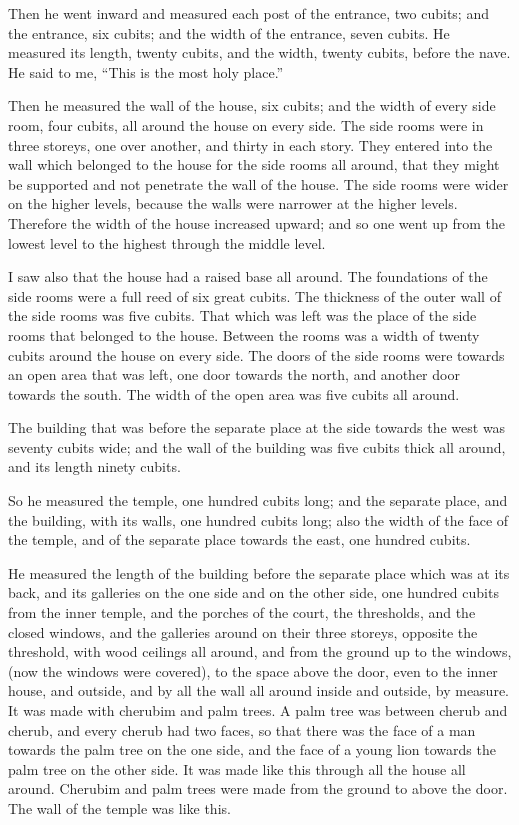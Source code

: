  Then he went inward and measured each post of the
entrance, two cubits; and the entrance, six cubits; and the width of the
entrance, seven cubits.  He measured its length, twenty
cubits, and the width, twenty cubits, before the nave. He said to me,
``This is the most holy place.''

 Then he measured the wall of the house, six cubits; and
the width of every side room, four cubits, all around the house on every
side.  The side rooms were in three storeys, one over
another, and thirty in each story. They entered into the wall which
belonged to the house for the side rooms all around, that they might be
supported and not penetrate the wall of the house.  The
side rooms were wider on the higher levels, because the walls were
narrower at the higher levels. Therefore the width of the house
increased upward; and so one went up from the lowest level to the
highest through the middle level.

 I saw also that the house had a raised base all around.
The foundations of the side rooms were a full reed of six great cubits.
 The thickness of the outer wall of the side rooms was
five cubits. That which was left was the place of the side rooms that
belonged to the house.  Between the rooms was a width of
twenty cubits around the house on every side.  The doors
of the side rooms were towards an open area that was left, one door
towards the north, and another door towards the south. The width of the
open area was five cubits all around.

 The building that was before the separate place at the
side towards the west was seventy cubits wide; and the wall of the
building was five cubits thick all around, and its length ninety cubits.

 So he measured the temple, one hundred cubits long; and
the separate place, and the building, with its walls, one hundred cubits
long;  also the width of the face of the temple, and of
the separate place towards the east, one hundred cubits.

 He measured the length of the building before the
separate place which was at its back, and its galleries on the one side
and on the other side, one hundred cubits from the inner temple, and the
porches of the court,  the thresholds, and the closed
windows, and the galleries around on their three storeys, opposite the
threshold, with wood ceilings all around, and from the ground up to the
windows, (now the windows were covered),  to the space
above the door, even to the inner house, and outside, and by all the
wall all around inside and outside, by measure.  It was
made with cherubim and palm trees. A palm tree was between cherub and
cherub, and every cherub had two faces,  so that there
was the face of a man towards the palm tree on the one side, and the
face of a young lion towards the palm tree on the other side. It was
made like this through all the house all around. 
Cherubim and palm trees were made from the ground to above the door. The
wall of the temple was like this.

